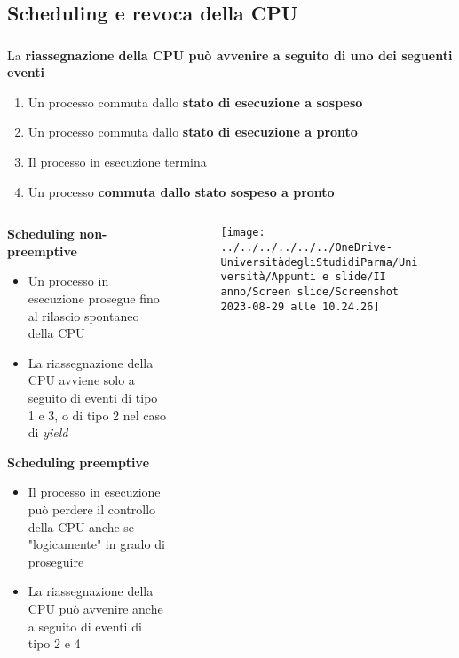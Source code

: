 \documentclass{beamer}
\newenvironment{mainframe}{
	\begin{frame}
		\frametitle{\insertsubsection}
		\framesubtitle{\insertsection}
	}{
	\end{frame}
}
\begin{document}
\subsection{Scheduling e revoca della CPU}
\begin{mainframe}
	La \textbf{riassegnazione della CPU può avvenire a seguito di uno dei seguenti eventi}
	\begin{enumerate}
		\item Un processo commuta dallo \textbf{stato di esecuzione a sospeso}
		\item Un processo commuta dallo \textbf{stato di esecuzione a pronto}
		\item Il processo in esecuzione termina
		\item Un processo \textbf{commuta dallo stato sospeso a pronto}
	\end{enumerate}
\end{mainframe}
\begin{frame}
\begin{columns}
	\begin{column}{0.6 \textwidth}
			\textbf{Scheduling non-preemptive}
		\begin{itemize}
			\item Un processo in esecuzione prosegue fino al rilascio spontaneo della CPU
			\item La riassegnazione della CPU avviene solo a seguito di eventi di tipo 1 e 3, o di tipo 2 nel caso di \textit{yield}
		\end{itemize}
		\textbf{Scheduling preemptive}
		\begin{itemize}
			\item Il processo in esecuzione può perdere il controllo della CPU anche se "logicamente" in grado di proseguire
			\item La riassegnazione della CPU può avvenire anche a seguito di eventi di tipo 2 e 4
		\end{itemize}
	\end{column}
\begin{column}{0.4 \textheight}
\begin{figure}
	\centering
	\texttt{[image: ../../../../../../OneDrive-UniversitàdegliStudidiParma/Università/Appunti e slide/II anno/Screen slide/Screenshot 2023-08-29 alle 10.24.26]}
\end{figure}
\end{column}
\end{columns}
\end{frame}
\end{document}
